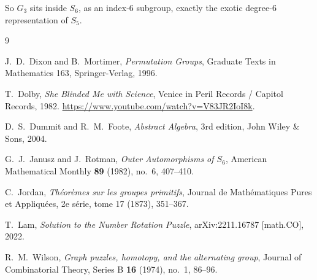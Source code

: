 \documentclass[11pt]{article}
\begin{document}
So $G_3$ sits inside $S_6$, as an index-$6$ subgroup, exactly the exotic degree-$6$ representation of $S_5$.

\begin{thebibliography}{9}

J.~D.~Dixon and B.~Mortimer,
\emph{Permutation Groups},
Graduate Texts in Mathematics 163, Springer-Verlag, 1996.

T.~Dolby,
\emph{She Blinded Me with Science},
Venice in Peril Records / Capitol Records, 1982.
\url{https://www.youtube.com/watch?v=V83JR2IoI8k}.

D.~S.~Dummit and R.~M.~Foote,
\emph{Abstract Algebra},
3rd edition, John Wiley \& Sons, 2004.

G.~J.~Janusz and J.~Rotman,
\emph{Outer Automorphisms of $S_6$},
American Mathematical Monthly \textbf{89} (1982), no.~6, 407--410.

C.~Jordan,
\emph{Th\'eor\`emes sur les groupes primitifs},
Journal de Math\'ematiques Pures et Appliqu\'ees, 2e s\'erie, tome 17 (1873), 351--367.

T.~Lam,
\emph{Solution to the Number Rotation Puzzle},
arXiv:2211.16787 [math.CO], 2022.

R.~M.~Wilson,
\emph{Graph puzzles, homotopy, and the alternating group},
Journal of Combinatorial Theory, Series B \textbf{16} (1974), no.~1, 86--96.

\end{thebibliography}
\end{document}
